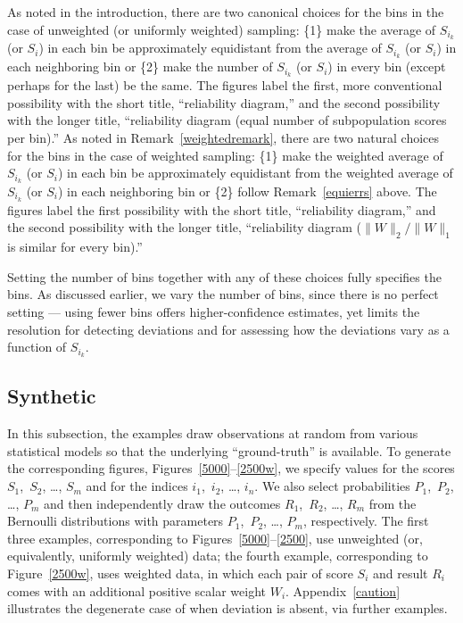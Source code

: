 \documentclass{article}
\begin{document}
As noted in the introduction, there are two canonical choices for the bins
in the case of unweighted (or uniformly weighted) sampling:
\{1\} make the average of $S_{i_k}$ (or $S_i$) in each bin
be approximately equidistant from the average of $S_{i_k}$ (or $S_i$)
in each neighboring bin or
\{2\} make the number of $S_{i_k}$ (or $S_i$) in every bin
(except perhaps for the last) be the same.
The figures label the first, more conventional possibility
with the short title, ``reliability diagram,'' and the second possibility
with the longer title,
``reliability diagram (equal number of subpopulation scores per bin).''
As noted in Remark~\ref{weightedremark}, there are two natural choices
for the bins in the case of weighted sampling:
\{1\} make the weighted average of $S_{i_k}$ (or $S_i$) in each bin
be approximately equidistant from the weighted average of $S_{i_k}$ (or $S_i$)
in each neighboring bin or
\{2\} follow Remark~\ref{equierrs} above.
The figures label the first possibility with the short title,
``reliability diagram,'' and the second possibility
with the longer title,
``reliability diagram ($\|W\|_2/\|W\|_1$ is similar for every bin).''

Setting the number of bins together with any of these choices
fully specifies the bins. As discussed earlier, we vary the number of bins,
since there is no perfect setting --- using fewer bins offers higher-confidence
estimates, yet limits the resolution for detecting deviations
and for assessing how the deviations vary as a function of $S_{i_k}$.


\subsection{Synthetic}
\label{synthetic}

In this subsection, the examples draw observations at random
from various statistical models so that the underlying ``ground-truth''
is available. To generate the corresponding figures,
Figures~\ref{5000}--\ref{2500w}, we specify values for the scores
$S_1$,~$S_2$, \dots, $S_m$ and for the indices $i_1$,~$i_2$, \dots, $i_n$.
We also select probabilities $P_1$,~$P_2$, \dots, $P_m$
and then independently draw the outcomes $R_1$,~$R_2$, \dots, $R_m$
from the Bernoulli distributions with parameters $P_1$,~$P_2$, \dots, $P_m$,
respectively. The first three examples,
corresponding to Figures~\ref{5000}--\ref{2500}, use unweighted
(or, equivalently, uniformly weighted) data;
the fourth example, corresponding to Figure~\ref{2500w}, uses weighted data,
in which each pair of score $S_i$ and result $R_i$ comes
with an additional positive scalar weight $W_i$.
Appendix~\ref{caution} illustrates the degenerate case of when deviation
is absent, via further examples.
\end{document}
